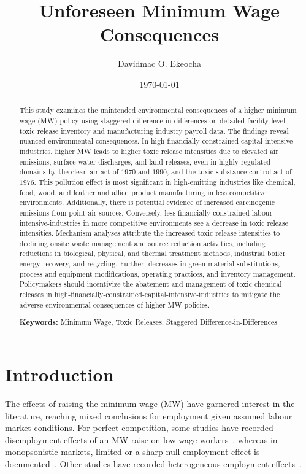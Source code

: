 \documentclass[12pt, english]{article}
\title{{Unforeseen Minimum Wage Consequences}}
\author[1]{Davidmac O. Ekeocha}
\affil[1]{
    University of Liverpool Management School \\
    \texttt{davidmac.ekeocha@liverpool.ac.uk}
}
\date{\today}
\begin{document}
    \maketitle
    \newpage
    \tableofcontents
    \newpage
    \listoffigures
    \newpage
    \listoftables

    \newpage
    \begin{abstract}
        \noindent This study examines the unintended environmental consequences of a higher minimum wage (MW) policy using staggered difference-in-differences on detailed facility level toxic release inventory and manufacturing industry payroll data. The findings reveal nuanced environmental consequences. In high-financially-constrained-capital-intensive-industries, higher MW leads to higher toxic release intensities due to elevated air emissions, surface water discharges, and land releases, even in highly regulated domains by the clean air act of $1970$ and $1990$, and the toxic substance control act of $1976$. This pollution effect is most significant in high-emitting industries like chemical, food, wood, and leather and allied product manufacturing in less competitive environments. Additionally, there is potential evidence of increased carcinogenic emissions from point air sources. Conversely, less-financially-constrained-labour-intensive-industries in more competitive environments see a decrease in toxic release intensities. Mechanism analyses attribute the increased toxic release intensities to declining onsite waste management and source reduction activities, including reductions in biological, physical, and thermal treatment methods, industrial boiler energy recovery, and recycling. Further, decreases in green material substitutions, process and equipment modifications, operating practices, and inventory management. Policymakers should incentivize the abatement and management of toxic chemical releases in high-financially-constrained-capital-intensive-industries to mitigate the adverse environmental consequences of higher MW policies.
        \par \noindent \textbf{Keywords:} Minimum Wage, Toxic Releases, Staggered Difference-in-Differences
    \end{abstract}


    \section{Introduction}\label{sec:introduction}
    The effects of raising the minimum wage (MW) have garnered interest in the literature, reaching mixed conclusions for employment given assumed labour market conditions. For perfect competition, some studies have recorded disemployment effects of an MW raise on low-wage workers~\parencite{stigler1946economics, hamermesh1982minimum, neumark1992employment, brown1999minimum, machin2004minimum, neumark2000minimum, borjas2010labor}, whereas in monopsonistic markets, limited or a sharp null employment effect is documented~\parencite{lester1960employment, card1993minimum, card2000minimum, aaronson2018industry, cengiz2019effect, wong2019minimum, dustmann2022reallocation}. Other studies have recorded heterogeneous employment effects~\parencite{okudaira2019minimum, medrano2023minimum, meer2023effects, gregory2022minimum}.
\end{document}
